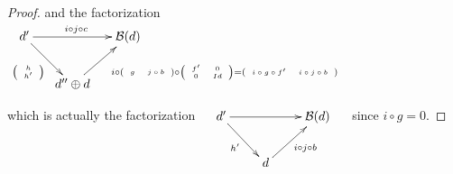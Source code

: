 \documentclass{amsart}
\theoremstyle{plain}
\theoremstyle{definition}
\begin{document}
\begin{proof}
and the factorization   \ \  $\xymatrix@R=.8cm@C=.5cm{d' \ar[rr]^{i\circ j\circ c} \ar[dr]_{\tiny{\left(
                 \begin{array}{c}
                   h \\
                   h' \\
                 \end{array}
               \right)} }&& \mathcal{B}(d) \\
& d''\oplus d \ar[ru]_{ \  \  \ \ \ \ i\circ \tiny{\left(
                                                  \begin{array}{cc}
                                                    g & j\circ b \\
                                                  \end{array}
                                                \right)
} \circ \tiny{\left(
                                                                      \begin{array}{cc}
                                                                        f' & 0 \\
                                                                        0 & Id \\
                                                                      \end{array}
                                                                    \right)}= \tiny{\left(
                                                  \begin{array}{cc}
                                                    i\circ g \circ f' & i\circ j\circ b \\
                                                  \end{array}
                                                \right)}} &}$

which is actually the factorization \ \  $\xymatrix@R=.8cm@C=.8cm{d' \ar[rr] \ar[dr]_{h'}&& \mathcal{B}(d) \\
&d \ar[ru]_{i\circ j \circ b}&}$  \ \  since  $i\circ g =0$.

\end{proof}
\end{document}
